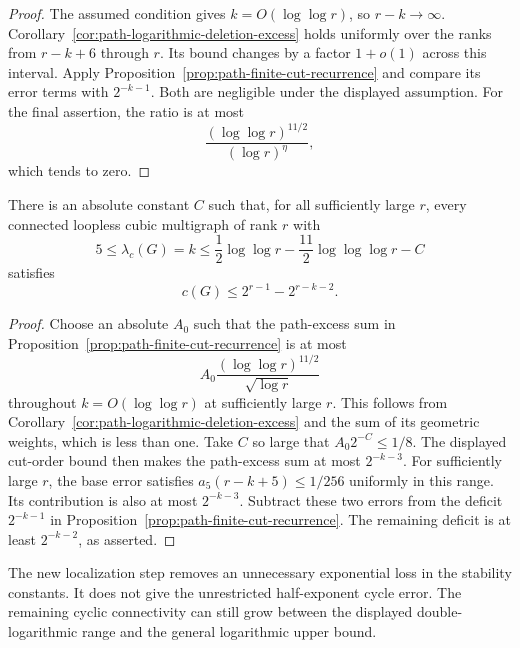 \begin{proof}
The assumed condition gives $k=O(\log\log r)$, so $r-k\to\infty$.
Corollary~\ref{cor:path-logarithmic-deletion-excess} holds uniformly over the ranks from $r-k+6$ through $r$.
Its bound changes by a factor $1+o(1)$ across this interval.
Apply Proposition~\ref{prop:path-finite-cut-recurrence} and compare its error terms with $2^{-k-1}$.
Both are negligible under the displayed assumption.
For the final assertion, the ratio is at most
\[
 \frac{(\log\log r)^{11/2}}{(\log r)^\eta},
\]
which tends to zero.
\end{proof}

\begin{corollary}
\label{cor:path-endpoint-loglog-cut}
There is an absolute constant $C$ such that, for all sufficiently large $r$, every connected loopless cubic multigraph of rank $r$ with
\[
 5\le\lambda_c(G)=k
 \le\frac12\log\log r-\frac{11}{2}\log\log\log r-C
\]
satisfies
\[
 c(G)\le2^{r-1}-2^{r-k-2}.
\]
\end{corollary}

\begin{proof}
Choose an absolute $A_0$ such that the path-excess sum in Proposition~\ref{prop:path-finite-cut-recurrence} is at most
\[
 A_0\frac{(\log\log r)^{11/2}}{\sqrt{\log r}}
\]
throughout $k=O(\log\log r)$ at sufficiently large $r$.
This follows from Corollary~\ref{cor:path-logarithmic-deletion-excess} and the sum of its geometric weights, which is less than one.
Take $C$ so large that $A_0 2^{-C}\le1/8$.
The displayed cut-order bound then makes the path-excess sum at most $2^{-k-3}$.
For sufficiently large $r$, the base error satisfies $a_5(r-k+5)\le1/256$ uniformly in this range.
Its contribution is also at most $2^{-k-3}$.
Subtract these two errors from the deficit $2^{-k-1}$ in Proposition~\ref{prop:path-finite-cut-recurrence}.
The remaining deficit is at least $2^{-k-2}$, as asserted.
\end{proof}

The new localization step removes an unnecessary exponential loss in the stability constants.
It does not give the unrestricted half-exponent cycle error.
The remaining cyclic connectivity can still grow between the displayed double-logarithmic range and the general logarithmic upper bound.
